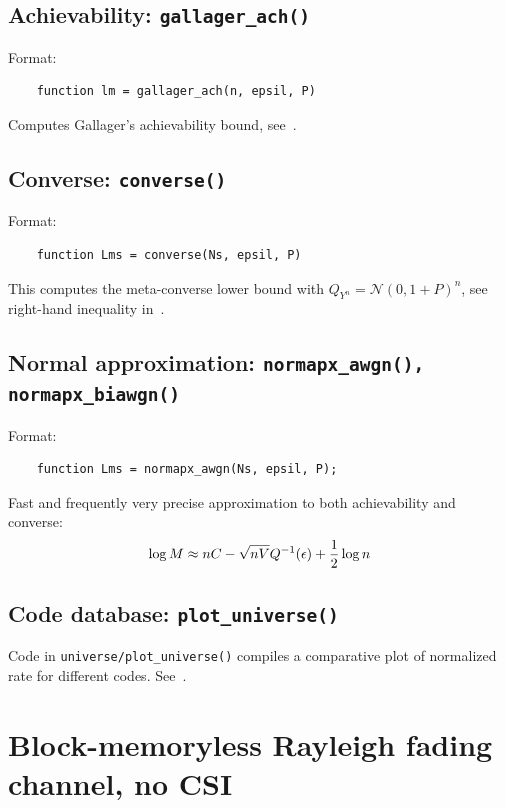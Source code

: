 \documentclass[a4paper,11p]{memoir}
\def\matn{\mathcal{N}}
\begin{document}
\section{Achievability: \texttt{gallager\_ach()}}
Format:
\begin{verbatim}
	function lm = gallager_ach(n, epsil, P)
\end{verbatim}

Computes Gallager's achievability bound, see~\cite[(44)]{PPV08}.

\section{Converse: \texttt{converse()}}
Format:
\begin{verbatim}
	function Lms = converse(Ns, epsil, P)
\end{verbatim}

This computes the meta-converse lower bound with $Q_{Y^n} = \matn(0, 1+P)^n$, see right-hand inequality in~\cite[(218)]{PPV08}. 


\section{Normal approximation: \texttt{normapx\_awgn(), normapx\_biawgn()}}

Format:
\begin{verbatim}
	function Lms = normapx_awgn(Ns, epsil, P);
\end{verbatim}

Fast and frequently very precise approximation to both achievability and converse:
	$$ \log M \approx n C - \sqrt{nV} Q^{-1}(\epsilon) + {1\over2} \log n $$


\section{Code database: \texttt{plot\_universe()}}

Code in \verb|universe/plot_universe()| compiles a comparative plot of normalized rate for different codes.
See~\cite[Section IV.D]{PPV08}.



\chapter[Block-memoryless Rayleigh fading (no CSI)]{Block-memoryless Rayleigh fading channel, no CSI}
\end{document}
